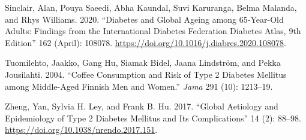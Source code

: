 \documentclass{scrartcl}
\begin{document}
\begin{hangparas}{1.5em}{1}
\hypertarget{citeproc_bib_item_8}{Sinclair, Alan, Pouya Saeedi, Abha Kaundal, Suvi Karuranga, Belma Malanda, and Rhys Williams. 2020. “Diabetes and Global Ageing among 65-Year-Old Adults: Findings from the International Diabetes Federation Diabetes Atlas, 9th Edition” 162 (April): 108078. \href{https://doi.org/10.1016/j.diabres.2020.108078}{https://doi.org/10.1016/j.diabres.2020.108078}.}

\hypertarget{citeproc_bib_item_9}{Tuomilehto, Jaakko, Gang Hu, Siamak Bidel, Jaana Lindström, and Pekka Jousilahti. 2004. “Coffee Consumption and Risk of Type 2 Diabetes Mellitus among Middle-Aged Finnish Men and Women.” \textit{Jama} 291 (10): 1213–19.}

\hypertarget{citeproc_bib_item_10}{Zheng, Yan, Sylvia H. Ley, and Frank B. Hu. 2017. “Global Aetiology and Epidemiology of Type 2 Diabetes Mellitus and Its Complications” 14 (2): 88–98. \href{https://doi.org/10.1038/nrendo.2017.151}{https://doi.org/10.1038/nrendo.2017.151}.}
\end{hangparas}
\end{document}
